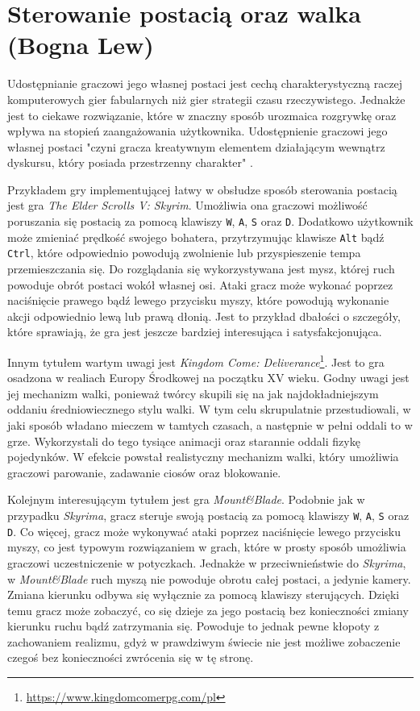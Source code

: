 \section{Sterowanie postacią oraz walka (Bogna Lew)}\label{s:walka}
Udostępnianie graczowi jego własnej postaci jest cechą charakterystyczną raczej komputerowych gier fabularnych niż gier
strategii czasu rzeczywistego. Jednakże jest to ciekawe rozwiązanie, które w znaczny sposób urozmaica rozgrywkę oraz
wpływa na stopień zaangażowania użytkownika. Udostępnienie graczowi jego własnej postaci "czyni gracza kreatywnym
elementem działającym wewnątrz dyskursu, który posiada przestrzenny charakter" \cite{olbrzymwcieniu}.

Przykładem gry implementującej łatwy w obsłudze sposób sterowania postacią jest gra \textit{The Elder Scrolls V: Skyrim}. Umożliwia
ona graczowi możliwość poruszania się postacią za pomocą klawiszy \texttt{W}, \texttt{A}, \texttt{S} oraz \texttt{D}. Dodatkowo użytkownik może
zmieniać prędkość swojego bohatera, przytrzymując klawisze \texttt{Alt} bądź \texttt{Ctrl}, które odpowiednio powodują zwolnienie lub
przyspieszenie tempa przemieszczania się. Do rozglądania się wykorzystywana jest mysz, której ruch powoduje obrót postaci
wokół własnej osi. Ataki gracz może wykonać poprzez naciśnięcie prawego bądź lewego przycisku myszy, które powodują
wykonanie akcji odpowiednio lewą lub prawą dłonią. Jest to przykład dbałości o szczegóły, które sprawiają, że gra
jest jeszcze bardziej interesująca i satysfakcjonująca.

Innym tytułem wartym uwagi jest \textit{Kingdom Come: Deliverance}\footnote{\url{https://www.kingdomcomerpg.com/pl}}. Jest to gra osadzona w realiach Europy Środkowej na początku
XV wieku. Godny uwagi jest jej mechanizm walki, ponieważ twórcy skupili się na jak najdokładniejszym oddaniu średniowiecznego
stylu walki. W tym celu skrupulatnie przestudiowali, w jaki sposób władano mieczem w tamtych czasach, a następnie w
pełni oddali to w grze. Wykorzystali do tego tysiące animacji oraz starannie oddali fizykę pojedynków. W efekcie powstał
realistyczny mechanizm walki, który umożliwia graczowi parowanie, zadawanie ciosów oraz blokowanie.

Kolejnym interesującym tytułem jest gra \textit{Mount\&Blade}. Podobnie jak w przypadku \textit{Skyrima}, gracz steruje swoją postacią za
pomocą klawiszy \texttt{W}, \texttt{A}, \texttt{S} oraz \texttt{D}. Co więcej, gracz może wykonywać ataki poprzez naciśnięcie
lewego przycisku myszy, co jest typowym rozwiązaniem w grach,
które w prosty sposób umożliwia graczowi uczestniczenie w potyczkach. Jednakże w przeciwnieństwie do \textit{Skyrima}, w
\textit{Mount\&Blade} ruch myszą nie powoduje obrotu całej postaci,
a jedynie kamery. Zmiana kierunku odbywa się wyłącznie za pomocą klawiszy sterujących. Dzięki temu gracz może zobaczyć, co
się dzieje za jego postacią bez konieczności zmiany kierunku ruchu bądź zatrzymania się. Powoduje to jednak pewne kłopoty z zachowaniem
realizmu, gdyż w prawdziwym świecie nie jest możliwe zobaczenie czegoś bez konieczności zwrócenia się w tę stronę.

